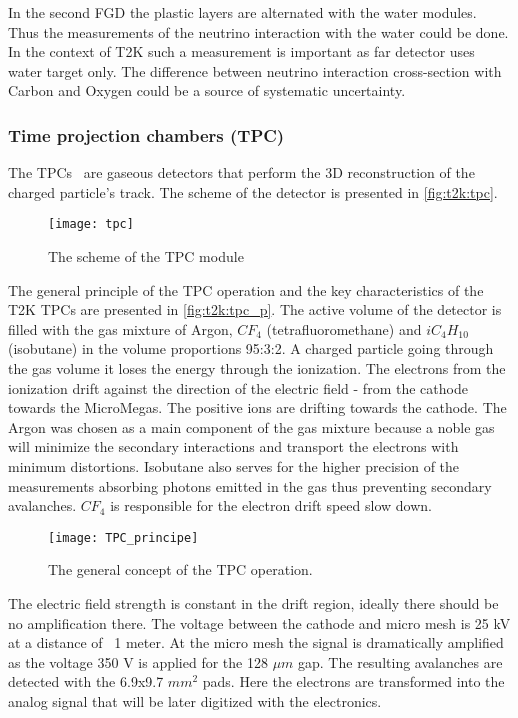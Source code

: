\documentclass[../main.tex]{subfiles}
\begin{document}
In the second FGD the plastic layers are alternated with the water modules. Thus the measurements of the neutrino interaction with the water could be done. In the context of T2K such a measurement is important as far detector uses water target only. The difference between neutrino interaction cross-section with Carbon and Oxygen could be a source of systematic uncertainty.

\subsubsection{Time projection chambers (TPC)}
The TPCs~\cite{Abgrall2011} are gaseous detectors that perform the 3D reconstruction of the charged particle's track. The scheme of the detector is presented in \autoref{fig:t2k:tpc}.

\begin{figure}[!ht]
  \centering
  \texttt{[image: tpc]}
  \caption{The scheme of the TPC module}
  \label{fig:t2k:tpc}
\end{figure}

The general principle of the TPC operation and the key characteristics of the T2K TPCs are presented in \autoref{fig:t2k:tpc_p}. The active volume of the detector is filled with the gas mixture of Argon, $CF_4$ (tetrafluoromethane) and $iC_4H_{10}$ (isobutane) in the volume proportions 95:3:2. A charged particle going through the gas volume it loses the energy through the ionization. The electrons from the ionization drift against the direction of the electric field - from the cathode towards the MicroMegas. The positive ions are drifting towards the cathode. The Argon was chosen as a main component of the gas mixture because a noble gas will minimize the secondary interactions and transport the electrons with minimum distortions. Isobutane also serves for the higher precision of the measurements absorbing photons emitted in the gas thus preventing secondary avalanches. $CF_4$ is responsible for the electron drift speed slow down.

\begin{figure}[!ht]
  \centering
  \texttt{[image: TPC\_principe]}
  \caption{The general concept of the TPC operation.}
  \label{fig:t2k:tpc_p}
\end{figure}

The electric field strength is constant in the drift region, ideally there should be no amplification there. The voltage between the cathode and micro mesh is 25 kV at a distance of ~1 meter. At the micro mesh the signal is dramatically amplified as the voltage 350 V is applied for the 128 $\mu m$ gap. The resulting avalanches are detected with the 6.9x9.7 $mm^2$ pads. Here the electrons are transformed into the analog signal that will be later digitized with the electronics.
\end{document}
